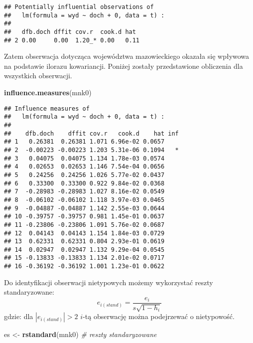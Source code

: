 \documentclass[polish,]{book}
\newenvironment{Shaded}{\begin{snugshade}}{\end{snugshade}}
\newcommand{\CommentTok}[1]{\textcolor[rgb]{0.56,0.35,0.01}{\textit{#1}}}
\newcommand{\KeywordTok}[1]{\textcolor[rgb]{0.13,0.29,0.53}{\textbf{#1}}}
\newcommand{\NormalTok}[1]{#1}
\newcommand{\StringTok}[1]{\textcolor[rgb]{0.31,0.60,0.02}{#1}}
\begin{document}
\begin{verbatim}
## Potentially influential observations of
##   lm(formula = wyd ~ doch + 0, data = t) :
## 
##   dfb.doch dffit cov.r  cook.d hat 
## 2 0.00     0.00  1.20_* 0.00   0.11
\end{verbatim}

Zatem obserwacja dotycząca województwa mazowieckiego okazała się wpływowa na
podstawie ilorazu kowariancji. Poniżej zostały przedstawione obliczenia dla wszystkich obserwacji.

\begin{Shaded}
\begin{Highlighting}[]
\KeywordTok{influence.measures}\NormalTok{(mnk0)}
\end{Highlighting}
\end{Shaded}

\begin{verbatim}
## Influence measures of
##   lm(formula = wyd ~ doch + 0, data = t) :
## 
##    dfb.doch    dffit cov.r   cook.d    hat inf
## 1   0.26381  0.26381 1.071 6.96e-02 0.0657    
## 2  -0.00223 -0.00223 1.203 5.31e-06 0.1094   *
## 3   0.04075  0.04075 1.134 1.78e-03 0.0574    
## 4   0.02653  0.02653 1.146 7.54e-04 0.0656    
## 5   0.24256  0.24256 1.026 5.77e-02 0.0437    
## 6   0.33300  0.33300 0.922 9.84e-02 0.0368    
## 7  -0.28983 -0.28983 1.027 8.16e-02 0.0549    
## 8  -0.06102 -0.06102 1.118 3.97e-03 0.0465    
## 9  -0.04887 -0.04887 1.142 2.55e-03 0.0644    
## 10 -0.39757 -0.39757 0.981 1.45e-01 0.0637    
## 11 -0.23806 -0.23806 1.091 5.76e-02 0.0687    
## 12  0.04143  0.04143 1.154 1.84e-03 0.0729    
## 13  0.62331  0.62331 0.804 2.93e-01 0.0619    
## 14  0.02947  0.02947 1.132 9.29e-04 0.0545    
## 15 -0.13833 -0.13833 1.134 2.01e-02 0.0717    
## 16 -0.36192 -0.36192 1.001 1.23e-01 0.0622
\end{verbatim}

Do identyfikacji obserwacji nietypowych możemy wykorzystać reszty standaryzowane:
\begin{equation}
e_{i(stand)}=\frac{e_i}{s\sqrt{1-h_i}}
\label{eq:wz1322}
\end{equation}
gdzie: dla \(|e_{i(stand)}|>2\) \(i\)-tą obserwację można podejrzewać o nietypowość.

\begin{Shaded}
\begin{Highlighting}[]
\NormalTok{es <-}\StringTok{ }\KeywordTok{rstandard}\NormalTok{(mnk0)  }\CommentTok{# reszty standaryzowane}
\end{Highlighting}
\end{Shaded}
\end{document}
